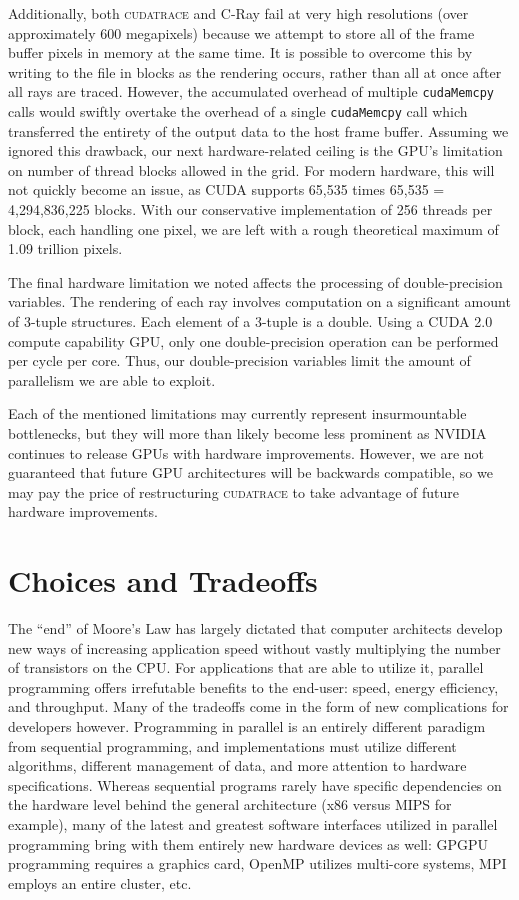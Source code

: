 \documentclass[12pt]{article}
\begin{document}
Additionally, both \textsc{cudatrace} and C-Ray fail at very high resolutions (over approximately 600 megapixels) because we attempt to store all of the frame buffer pixels in memory at the same time. It is possible to overcome this by writing to the file in blocks as the rendering occurs, rather than all at once after all rays are traced. However, the accumulated overhead of multiple \texttt{cudaMemcpy} calls would swiftly overtake the overhead of a single \texttt{cudaMemcpy} call which transferred the entirety of the output data to the host frame buffer. Assuming we ignored this drawback, our next hardware-related ceiling is the GPU’s limitation on number of thread blocks allowed in the grid. For modern hardware, this will not quickly become an issue, as CUDA  supports 65,535 times 65,535 = 4,294,836,225 blocks. With our conservative implementation of 256 threads per block, each handling one pixel, we are left with a rough theoretical maximum of 1.09 trillion pixels. 

The final hardware limitation we noted affects the processing of double-precision variables. The rendering of each ray involves computation on a significant amount of 3-tuple structures. Each element of a 3-tuple is a double.  Using a CUDA 2.0 compute capability GPU, only one double-precision operation can be performed per cycle per core. Thus, our double-precision variables limit the amount of parallelism we are able to exploit.

Each of the mentioned limitations may currently represent insurmountable bottlenecks, but they will more than likely become less prominent as NVIDIA continues to release GPUs with hardware improvements. However, we are not guaranteed that future GPU architectures will be backwards compatible, so we may pay the price of restructuring \textsc{cudatrace} to take advantage of future hardware improvements.

\section{Choices and Tradeoffs}

The ``end'' of Moore's Law has largely dictated that computer architects develop new ways of increasing application speed without vastly multiplying the number of transistors on the CPU. For applications that are able to utilize it, parallel programming offers irrefutable benefits to the end-user: speed, energy efficiency, and throughput. Many of the tradeoffs come in the form of new complications for developers however. Programming in parallel is an entirely different paradigm from sequential programming, and implementations must utilize different algorithms, different management of data,  and more attention to hardware specifications. Whereas sequential programs rarely have specific dependencies on the hardware level behind the general architecture (x86 versus MIPS for example), many of the latest and greatest software interfaces utilized in parallel programming bring with them entirely new hardware devices as well: GPGPU programming requires a graphics card, OpenMP utilizes multi-core systems, MPI employs an entire cluster, etc.       
\end{document}

